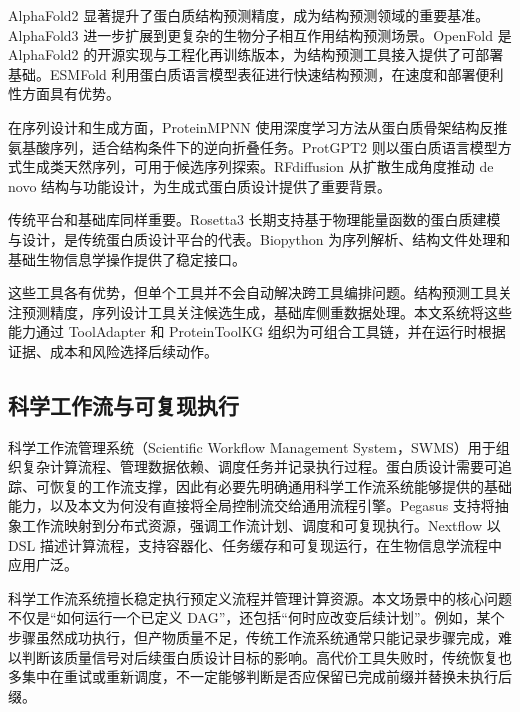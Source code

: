 AlphaFold2
显著提升了蛋白质结构预测精度，成为结构预测领域的重要基准\citep{jumper2021alphafold}。AlphaFold3
进一步扩展到更复杂的生物分子相互作用结构预测场景\citep{abramson2024alphafold3}。OpenFold
是 AlphaFold2
的开源实现与工程化再训练版本，为结构预测工具接入提供了可部署基础\citep{ahdritz2024openfold}。ESMFold
利用蛋白质语言模型表征进行快速结构预测，在速度和部署便利性方面具有优势\citep{lin2023esmfold}。

在序列设计和生成方面，ProteinMPNN
使用深度学习方法从蛋白质骨架结构反推氨基酸序列，适合结构条件下的逆向折叠任务\citep{dauparas2022proteinmpnn}。ProtGPT2
则以蛋白质语言模型方式生成类天然序列，可用于候选序列探索\citep{ferruz2022protgpt2}。RFdiffusion
从扩散生成角度推动 de novo
结构与功能设计，为生成式蛋白质设计提供了重要背景\citep{watson2023rfdiffusion}。

传统平台和基础库同样重要。Rosetta3
长期支持基于物理能量函数的蛋白质建模与设计，是传统蛋白质设计平台的代表\citep{leaverfay2011rosetta3}。Biopython
为序列解析、结构文件处理和基础生物信息学操作提供了稳定接口\citep{cock2009biopython}。

这些工具各有优势，但单个工具并不会自动解决跨工具编排问题。结构预测工具关注预测精度，序列设计工具关注候选生成，基础库侧重数据处理。本文系统将这些能力通过
ToolAdapter 和 ProteinToolKG
组织为可组合工具链，并在运行时根据证据、成本和风险选择后续动作。

\subsection{科学工作流与可复现执行}\label{ux79d1ux5b66ux5de5ux4f5cux6d41ux4e0eux53efux590dux73b0ux6267ux884c}

科学工作流管理系统（Scientific Workflow Management
System，SWMS）用于组织复杂计算流程、管理数据依赖、调度任务并记录执行过程。蛋白质设计需要可追踪、可恢复的工作流支撑，因此有必要先明确通用科学工作流系统能够提供的基础能力，以及本文为何没有直接将全局控制流交给通用流程引擎。Pegasus
支持将抽象工作流映射到分布式资源，强调工作流计划、调度和可复现执行\citep{deelman2005pegasus}。Nextflow
以 DSL
描述计算流程，支持容器化、任务缓存和可复现运行，在生物信息学流程中应用广泛\citep{ditommaso2017nextflow}。

科学工作流系统擅长稳定执行预定义流程并管理计算资源。本文场景中的核心问题不仅是``如何运行一个已定义
DAG''，还包括``何时应改变后续计划''。例如，某个步骤虽然成功执行，但产物质量不足，传统工作流系统通常只能记录步骤完成，难以判断该质量信号对后续蛋白质设计目标的影响。高代价工具失败时，传统恢复也多集中在重试或重新调度，不一定能够判断是否应保留已完成前缀并替换未执行后缀。

